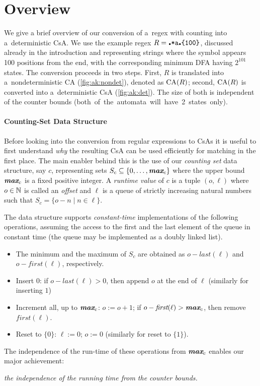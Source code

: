 \documentclass[acmsmall,screen]{acmart}
\begin{document}
\section{Overview}\label{sec:overview}
\vspace{-0.0mm}

We give a brief overview of our conversion of a~regex with counting into
a~deterministic CsA.
%
We use the example regex $R = \regex{\DOT*a\DOT\{100\}}$, discussed already in the
introduction and representing strings where the symbol  appears 100
positions from the end, with the corresponding minimum DFA having $2^{101}$
states.
%
The conversion proceeds in two steps.  First, $R$ is translated into
a~nondeterministic CA (\cref{fig:ak:nondet}), denoted as $\textrm{CA}(R)$; second, $\textrm{CA}(R)$ is converted into
a~deterministic CsA (\cref{fig:ak:det}).
%
The size of both is independent of the counter bounds \mbox{(both of the
automata will have 2 states only).}

\paragraph{Counting-Set Data Structure}
Before looking into the conversion from regular expressions to CsAs it
is useful to first understand \emph{why} the resulting CsA can be used
efficiently for matching in the first place.  The main enabler behind
this is the use of our \emph{counting set} data structure, say $c$,
representing sets $S_c\subseteq \{0,\ldots, \textit{\textbf{max}}_{c}\}$ where the upper
bound $\textit{\textbf{max}}_{c}$ is a fixed positive integer.  
A \emph{runtime value} of $c$ is a tuple $(o,\ell)$ where $o\in\mathbb{N}$ is called an
\emph{offset} and $\ell$ is a queue of strictly increasing natural numbers such that
$S_c = \{o - n \mid n \in \ell\}$. %

The data structure supports \emph{constant-time} implementations of the following operations, assuming the access to the first and the last element of the queue in constant time (the queue may be implemented as a doubly linked list).
\begin{itemize}
\item The minimum and the maximum of $S_c$ are obtained as $o-\textit{last}(\ell)$ and $o-\textit{first}(\ell)$, respectively. 
\item Insert 0: if $o-\textit{last}(\ell)>0$, then append $o$ at the end of $\ell$ (similarly for inserting $1$)
\item Increment all, up to $\textit{\textbf{max}}_{c}$: $o:=o+1$; if $o - \textit{first}(\ell) > \textit{\textbf{max}}_{c} $, then remove $\textit{first}(\ell)$.
\item Reset to $\{0\}$: $\ell:=0$; $o:=0$ (similarly for reset to $\{1\}$).
\end{itemize}
The independence of the run-time of these operations from {$\textit{\textbf{max}}_{c}$ enables our major achievement:} 
\begin{center}
\emph{the independence of the running time from the counter bounds.}
\end{center}
\end{document}
